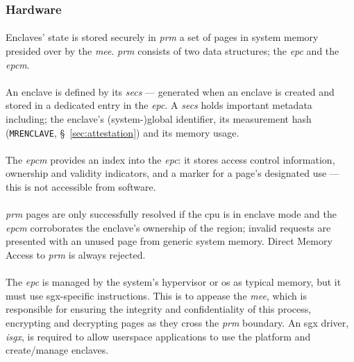 \subsubsection{Hardware}
\paragraph{} Enclaves' state is stored securely in \textit{\acrfull{prm}} a set of pages in system memory presided over by the \textit{\acrshort{mee}}. \textit{\acrshort{prm}} consists of two data structures; the \textit{\acrfull{epc}} and the \textit{\acrfull{epcm}}.

\paragraph{} An enclave is defined by its \textit{\acrshort{secs}} --- generated when an enclave is created and stored in a dedicated entry in the \textit{\acrshort{epc}}. A \textit{\acrshort{secs}} holds important metadata including; the enclave's (system-)global identifier, its measurement hash (\texttt{MRENCLAVE}, §~\ref{sec:attestation}) and its memory usage.

\paragraph{} The \textit{\acrshort{epcm}} provides an index into the \textit{\acrshort{epc}}: it stores access control information, ownership and validity indicators, and a marker for a page's designated use --- this is not accessible from software. 

\paragraph{} \textit{\acrshort{prm}} pages are only successfully resolved if the \acrshort{cpu} is in enclave mode and the \textit{\acrshort{epcm}} corroborates the enclave's ownership of the region; invalid requests are presented with an unused page from generic system memory. Direct Memory Access to \textit{\acrshort{prm}} is always rejected.

\paragraph{} The \textit{\acrshort{epc}} is managed by the system's hypervisor or \acrshort{os} as typical memory, but it must use \acrshort{sgx}-specific instructions. This is to appease the \textit{\acrshort{mee}}, which is responsible for ensuring the integrity and confidentiality of this process, encrypting and decrypting pages as they cross the \textit{\acrshort{prm}} boundary. An \acrshort{sgx} driver, \textit{isgx}, is required to allow userspace applications to use the platform and create/manage enclaves.


